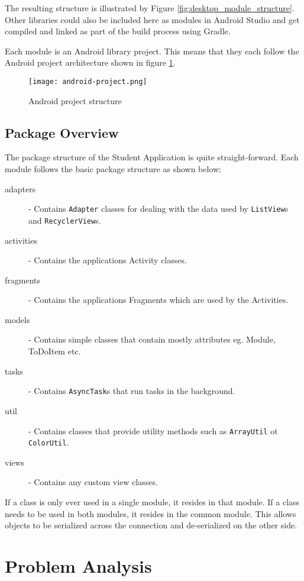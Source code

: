 The resulting structure is illustrated by Figure
\ref{fig:desktop_module_structure}. Other libraries could also be included here
as modules in Android Studio and get compiled and linked as part of the build
process using Gradle.

Each module is an Android library project. This means that they each follow the
Android project architecture shown in figure \ref{fig:android_project}.

\begin{figure}
    \centering
    \texttt{[image: android-project.png]}
    \caption{Android project structure}
    \label{fig:android_project}
\end{figure}

\subsection{Package Overview}

The package structure of the Student Application is quite straight-forward. Each
module follows the basic package structure as shown below:

\begin{description}
\item[adapters] - Contains \texttt{Adapter} classes for dealing with the data
    used by \texttt{ListView}s and \texttt{RecyclerView}s.
\item[activities] - Contains the applications Activity classes.
\item[fragments] - Contains the applications Fragments which are used by the
    Activities.
\item[models] - Contains simple classes that contain mostly attributes eg.
    Module, ToDoItem etc.
\item[tasks] - Contains \texttt{AsyncTask}s that run tasks in the background.
\item[util] - Contains classes that provide utility methods such as
    \texttt{ArrayUtil} ot \texttt{ColorUtil}.
\item[views] - Contains any custom view classes.
\end{description}

If a class is only ever used in a single module, it resides in that module. If
a class needs to be used in both modules, it resides in the common module. This
allows objects to be serialized across the connection and de-serialized on the
other side.

\section{Problem Analysis}

